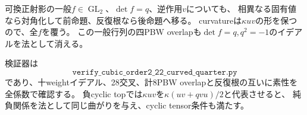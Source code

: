 可換正射影の一般$f\in\operatorname{GL}_2$、$\det f=q$、逆作用$v$についても、
相異なる固有値なら対角化して前命題、反復根なら後命題へ移る。
curvatureは$\kappa uv$の形を保つので、全$f$を覆う。
この一般行列の四PBW overlapも$\det f=q,q^2=-1$のイデアルを法として消える。

検証器は
\[
 \texttt{verify\_cubic\_order2\_22\_curved\_quarter.py}
\]
であり、十weightイデアル、28交叉、計8PBW overlapと反復根の互いに素性を全係数で確認する。
負cyclic topでは$\kappa uv$を$\kappa(uv+qvu)/2$と代表させると、
純負関係を法として同じ曲がりを与え、cyclic tensor条件も満たす。
